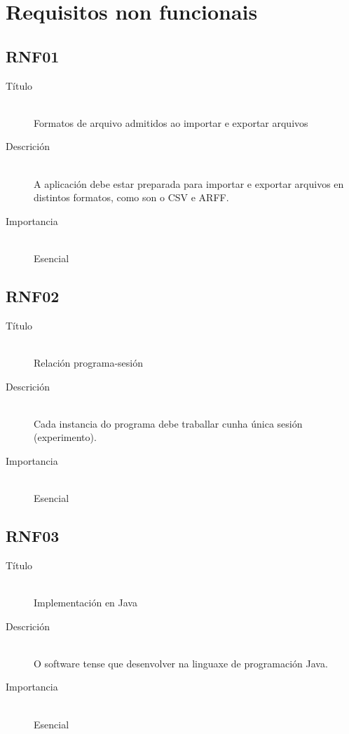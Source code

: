 \section{Requisitos non funcionais}

\subsection*{RNF01}
\begin{description}
\item[Título] \hfill \\
Formatos de arquivo admitidos ao importar e exportar arquivos
\item[Descrición] \hfill \\
A aplicación debe estar preparada para importar e exportar arquivos en distintos formatos, como son o CSV e ARFF.
\item[Importancia] \hfill \\
Esencial
\end{description}

\subsection*{RNF02}
\begin{description}
\item[Título] \hfill \\
Relación programa-sesión
\item[Descrición] \hfill \\
Cada instancia do programa debe traballar cunha única sesión (experimento).
\item[Importancia] \hfill \\
Esencial
\end{description}

\subsection*{RNF03}
\begin{description}
\item[Título] \hfill \\
Implementación en Java
\item[Descrición] \hfill \\
O software tense que desenvolver na linguaxe de programación Java.
\item[Importancia] \hfill \\
Esencial
\end{description}

